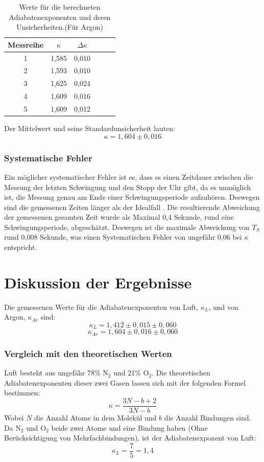 \documentclass[11pt,a4paper]{article} %
\begin{document}
\begin{table} [h]
	\begin{tabular*}{0.99\textwidth}{@{\extracolsep{\fill}}cccccc}
		\toprule
		Messreihe & $\kappa$ & $\Delta \kappa$  \\
		\bottomrule
		1 & 1,585 & 0,010 \\
		2 & 1,593 & 0,010 \\
		3 & 1,625 &  0,024 \\
		4 & 1,609 & 0,016 \\
		5 & 1,609  & 0,012 \\
		\bottomrule
	\end{tabular*}
	\caption{Werte für die berechneten Adiabatenexponenten und deren Unsicherheiten.(Für Argon)}
\end{table} 

\FloatBarrier
Der Mittelwert und seine Standardunsicherheit lauten:
$$ \kappa = 1,604 \pm 0,016$$

\subsubsection{Systematische Fehler}
Ein möglicher systematischer Fehler ist es, dass es einen Zeitdauer zwischen die Messung der letzten Schwingung und den Stopp der Uhr gibt, da es unmöglich ist, die Messung genau am Ende einer Schwingungsperiode aufzuhören. Deswegen sind die gemessenen Zeiten länger als der Idealfall . Die resultierende Abweichung der gemessenen gesamten Zeit wurde als Maximal 0,4 Sekunde, rund eine Schwingungsperiode, abgeschätzt. Deswegen ist die maximale Abweichung von $T_S$ rund 0,008 Sekunde, was einen Systematischen Fehler von ungefähr 0,06 bei $\kappa$ entspricht. 

\section{Diskussion der Ergebnisse}
Die gemessenen Werte für die Adiabatenexponenten von Luft, $\kappa_L$, und von Argon, $\kappa_{Ar}$ sind:
$$\kappa_L = 1,412 \pm 0,015 \pm 0,060$$
$$\kappa_{Ar} = 1,604 \pm 0,016 \pm 0,060$$

\subsubsection{Vergleich mit den theoretischen Werten}
Luft besteht aus ungefähr 78\% N$_2$ und 21\% O$_2$. Die theoretischen Adiabatenexponenten dieser zwei Gasen lassen sich mit der folgenden Formel bestimmen:
\begin{equation}
\kappa = \frac{3N-b+2}{3N-b}
\end{equation}
Wobei $N$ die Anzahl Atome in dem Molekül und $b$ die Anzahl Bindungen sind. Da N$_2$ und O$_2$ beide zwei Atome und eine Bindung haben (Ohne Berücksichtigung von Mehrfachbindungen), ist der Adiabatenexponent von Luft: 
$$\kappa_L = \frac{7}{5} = 1,4$$
\end{document}

